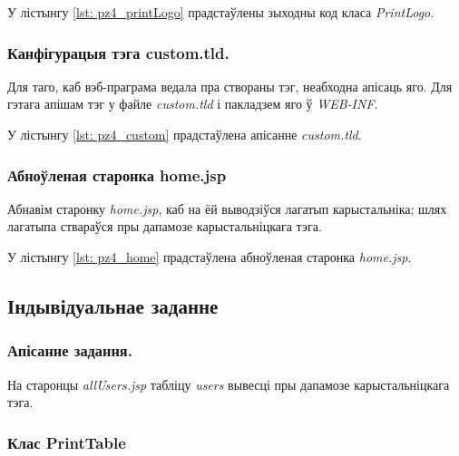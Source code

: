 У лістынгу \ref{lst: pz4_printLogo} прадстаўлены зыходны код класа \textit{PrintLogo}.



\vspace{-\baselineskip}
\subsubsection{Канфігурацыя тэга custom.tld.}

Для таго, каб вэб-праграма ведала пра створаны тэг, неабходна
апісаць яго. Для гэтага апішам тэг у файле \textit{custom.tld} і
пакладзем яго ў \textit{WEB-INF}.

У лістынгу \ref{lst: pz4_custom} прадстаўлена апісанне \textit{custom.tld}.



\vspace{-\baselineskip}
\subsubsection{Абноўленая старонка home.jsp}

Абнавім старонку \textit{home.jsp}, каб на ёй выводзіўся лагатып
карыстальніка; шлях лагатыпа ствараўся пры дапамозе карыстальніцкага
тэга.

У лістынгу \ref{lst: pz4_home} прадстаўлена абноўленая старонка \textit{home.jsp}.



\subsection{Індывідуальнае заданне}

\subsubsection{Апісанне задання.}

На старонцы \textit{allUsers.jsp} табліцу \textit{users} вывесці
пры дапамозе карыстальніцкага тэга.

\subsubsection{Клас PrintTable}

